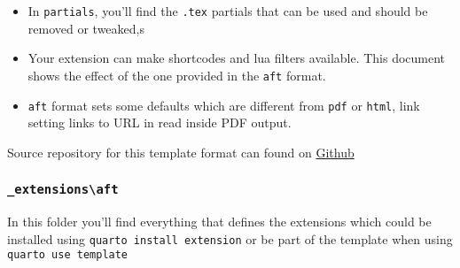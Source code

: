 \documentclass[
]{aft}
\begin{document}
\begin{itemize}
\item
  In \texttt{partials}, you'll find the \texttt{.tex} partials that can
  be used and should be removed or tweaked,s
\item
  Your extension can make shortcodes and lua filters available. This
  document shows the effect of the one provided in the \texttt{aft}
  format.
\item
  \texttt{aft} format sets some defaults which are different from
  \texttt{pdf} or \texttt{html}, link setting links to URL in read
  inside PDF output.
\end{itemize}

Source repository for this template format can found on
\href{https://github.com/quarto-journals/article-format-template}{Github}

\subsubsection{\texorpdfstring{\texttt{\_extensions\textbackslash{}aft}}{\_extensions\textbackslash aft}}\label{extensionsaft}

In this folder you'll find everything that defines the extensions which
could be installed using \texttt{quarto\ install\ extension} or be part
of the template when using \texttt{quarto\ use\ template}
\end{document}
